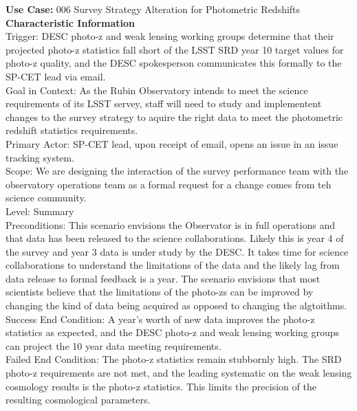 {\bf Use Case:} 006 Survey Strategy Alteration for Photometric Redshifts \\

{\bf Characteristic Information} \\
Trigger: DESC photo-z and weak lensing working groups determine that their projected photo-z statistics fall short of the LSST SRD year 10 target values for photo-z quality, and the DESC spokesperson communicates this formally to the SP-CET lead via email. \\
Goal in Context: As the Rubin Observatory intends to meet the science requirements of its LSST servey, staff will need to study and implementent changes to the survey strategy to aquire the right data to meet the photometric redshift statistics requirements. \\
Primary Actor: SP-CET lead, upon receipt of email, opens an issue in an issue tracking system. \\
Scope: We are designing the interaction of the survey performance team with the observatory operations team as a formal request for a change comes from teh science community. \\
Level: Summary \\
Preconditions: This scenario envisions the Observator is in full operations and that data has been released to the science collaborations.  Likely this is year 4 of the survey and year 3 data is under study by the DESC.  It takes time for science collaborations to understand the limitations of the data and the likely lag from data release to formal feedback is a year. The scenario envisions that most scientists believe that the limitations of the photo-zs can be improved by changing the kind of data being acquired as opposed to changing the algtoithms. \\
Success End Condition: A year's worth of new data improves the photo-z statistics as expected, and the DESC photo-z and weak lensing working groups can project the 10 year data meeting requirements. \\
Failed End Condition: The photo-z statistics remain stubbornly high.  The SRD photo-z requirements are not met, and the leading systematic on the weak lensing cosmology results is the photo-z statistics.  This limits the precision of the resulting cosmological parameters. \\

